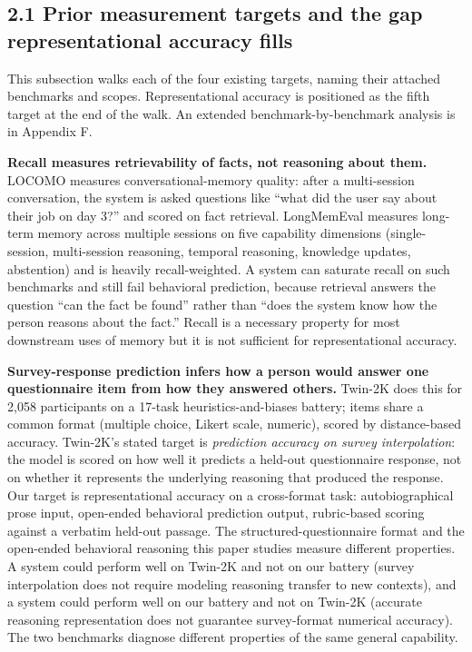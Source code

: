 \hypertarget{prior-measurement-targets-and-the-gap-representational-accuracy-fills}{%
\subsection{2.1 Prior measurement targets and the gap representational
accuracy
fills}\label{prior-measurement-targets-and-the-gap-representational-accuracy-fills}}

This subsection walks each of the four existing targets, naming their
attached benchmarks and scopes. Representational accuracy is positioned
as the fifth target at the end of the walk. An extended
benchmark-by-benchmark analysis is in Appendix F.

\textbf{Recall measures retrievability of facts, not reasoning about
them.} LOCOMO \citep{maharana2024locomo} measures
conversational-memory quality: after a multi-session conversation, the
system is asked questions like ``what did the user say about their job
on day 3?'' and scored on fact retrieval. LongMemEval \citep{wu2025longmemeval} measures long-term memory across multiple
sessions on five capability dimensions (single-session, multi-session
reasoning, temporal reasoning, knowledge updates, abstention) and is
heavily recall-weighted. A system can saturate recall on such benchmarks
and still fail behavioral prediction, because retrieval answers the
question ``can the fact be found'' rather than ``does the system know
how the person reasons about the fact.'' Recall is a necessary property
for most downstream uses of memory but it is not sufficient for
representational accuracy.

\textbf{Survey-response prediction infers how a person would answer one
questionnaire item from how they answered others.} Twin-2K \citep{toubia2025twin2k} does this for 2,058 participants on a
17-task heuristics-and-biases battery; items share a common format
(multiple choice, Likert scale, numeric), scored by distance-based
accuracy. Twin-2K's stated target is \emph{prediction accuracy on survey
interpolation}: the model is scored on how well it predicts a held-out
questionnaire response, not on whether it represents the underlying
reasoning that produced the response. Our target is representational
accuracy on a cross-format task: autobiographical prose input,
open-ended behavioral prediction output, rubric-based scoring against a
verbatim held-out passage. The structured-questionnaire format and the
open-ended behavioral reasoning this paper studies measure different
properties. A system could perform well on Twin-2K and not on our
battery (survey interpolation does not require modeling reasoning
transfer to new contexts), and a system could perform well on our
battery and not on Twin-2K (accurate reasoning representation does not
guarantee survey-format numerical accuracy). The two benchmarks diagnose
different properties of the same general capability.

